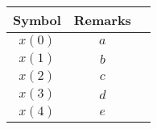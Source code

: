 \begin{tabular}{|c|c|c|}
    \hline
     \textbf{Symbol} & \textbf{Remarks} \\
    \hline
     $x(0)$ &  $a$\\[6pt]
    \hline 
     $x(1)$ &  $b$\\[6pt]
    \hline
     $x(2)$ &  $c$\\[6pt]
    \hline
     $x(3)$ &  $d$\\[6pt]
    \hline
     $x(4)$ &  $e$\\[6pt]
    \hline
\end{tabular}

